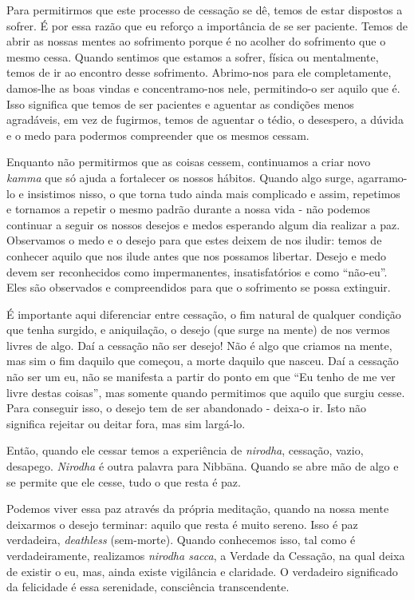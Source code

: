 Para permitirmos que este processo de cessação se dê, temos de estar dispostos a
sofrer. É por essa razão que eu reforço a importância de se ser paciente. Temos
de abrir as nossas mentes ao sofrimento porque é no acolher do sofrimento que o
mesmo cessa. Quando sentimos que estamos a sofrer, física ou mentalmente, temos
de ir ao encontro desse sofrimento. Abrimo-nos para ele completamente, damos-lhe
as boas vindas e concentramo-nos nele, permitindo-o ser aquilo que é. Isso
significa que temos de ser pacientes e aguentar as condições menos agradáveis,
em vez de fugirmos, temos de aguentar o tédio, o desespero, a dúvida e o medo para
podermos compreender que os mesmos cessam.

Enquanto não permitirmos que as coisas cessem, continuamos a criar novo
\emph{kamma} que só ajuda a fortalecer os nossos hábitos. Quando algo surge,
agarramo-lo e insistimos nisso, o que torna tudo ainda mais complicado e assim,
repetimos e tornamos a repetir o mesmo padrão durante a nossa vida - não podemos
continuar a seguir os nossos desejos e medos esperando algum dia realizar a paz.
Observamos o medo e o desejo para que estes deixem de nos iludir: temos de
conhecer aquilo que nos ilude antes que nos possamos libertar. Desejo e medo
devem ser reconhecidos como impermanentes, insatisfatórios e como “não-eu”. Eles
são observados e compreendidos para que o sofrimento se possa extinguir.

É importante aqui diferenciar entre cessação, o fim natural de qualquer condição
que tenha surgido, e aniquilação, o desejo (que surge na mente) de nos vermos
livres de algo. Daí a cessação não ser desejo! Não é algo que criamos na mente,
mas sim o fim daquilo que começou, a morte daquilo que nasceu. Daí a cessação não
ser um eu, não se manifesta a partir do ponto em que “Eu tenho de me ver livre
destas coisas”, mas somente quando permitimos que aquilo que surgiu cesse. Para
conseguir isso, o desejo tem de ser abandonado - deixa-o ir. Isto não significa
rejeitar ou deitar fora, mas sim largá-lo.

Então, quando ele cessar temos a experiência de \emph{nirodha}, cessação, vazio,
desapego. \emph{Nirodha} é outra palavra para Nibbāna. Quando se abre mão
de algo e se permite que ele cesse, tudo o que resta é paz.

Podemos viver essa paz através da própria meditação, quando na nossa mente
deixarmos o desejo terminar: aquilo que resta é muito sereno. Isso é paz
verdadeira, \emph{deathless} (sem-morte). Quando conhecemos isso, tal como é
verdadeiramente, realizamos \emph{nirodha sacca}, a Verdade da Cessação, na qual
deixa de existir o eu, mas, ainda existe vigilância e claridade. O verdadeiro
significado da felicidade é essa serenidade, consciência transcendente.

